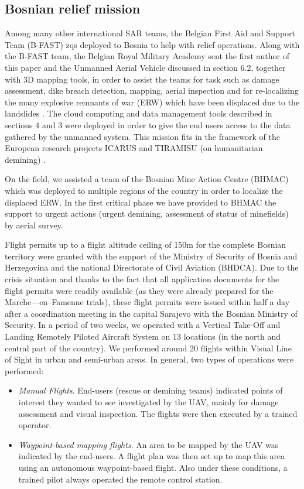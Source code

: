 \documentclass{article}
\begin{document}
\subsection{Bosnian relief mission}
Among many other international SAR teams, the Belgian First Aid and Support Team (B-FAST) zqs deployed to Bosnia to help with relief operations.
Along with the B-FAST team, the Belgian Royal Military Academy sent the first author of this paper and the Unmanned Aerial Vehicle discussed in section 6.2, together with 3D mapping tools, in order to assist the teams for task such as damage assessment, dike breach detection, mapping, aerial inspection and for re-localizing the many explosive remnants of war (ERW) which have been displaced due to the landslides \cite{bosnia1}. The cloud computing and data management tools described in sections 4 and 3 were deployed in order to give the end users access to the data gathered by the unmanned system. This mission fits in the framework of the European research projects ICARUS \cite{ICARUS} and TIRAMISU (on humanitarian demining) \cite{tiramisu}.

On the field, we assisted a team of the Bosnian Mine Action Centre (BHMAC) which was deployed to multiple regions of the country in order to localize the displaced ERW.
In the first critical phase we have provided to BHMAC the support to urgent actions (urgent demining, assessment of status of minefields) by aerial survey.

Flight permits up to a flight altitude ceiling of 150m for the complete Bosnian territory were granted with the support of the Ministry of Security of Bosnia and Herzegovina and the national Directorate of Civil Aviation (BHDCA).
Due to the crisis situation and thanks to the fact that all application documents for the flight permits were readily available (as they were already prepared for the Marche—en--Famenne trials), these flight permits were issued within half a day after a coordination meeting in the capital Sarajevo with the Bosnian Ministry of Security.
In a period of two weeks, we operated with a Vertical Take-Off and Landing Remotely Piloted Aircraft System on 13 locations (in the north and central part of the country).
We performed around 20 flights within Visual Line of Sight in urban and semi-urban areas. In general, two types of operations were performed:
\begin{itemize}
\item \emph{Manual Flights}. End-users (rescue or demining teams) indicated points of interest they wanted to see investigated by the UAV, mainly for damage assessment and visual inspection.
The flights were then executed by a trained operator.
\item  \emph{Waypoint-based mapping flights}. An area to be mapped by the UAV was indicated by the end-users. A flight plan was then set up to map this area using an autonomous waypoint-based flight.
Also under these conditions, a trained pilot always operated the remote control station.
\end{itemize}
\end{document}
